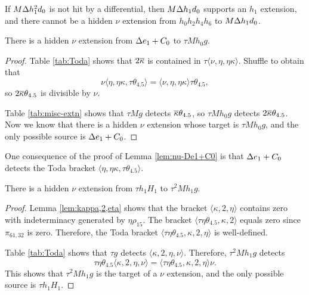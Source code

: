 \begin{remark}
\label{rem:h0h2h4h6}
If $M \Delta h_1^2 d_0$ is not hit by a differential, then
$M \Delta h_1 d_0$ supports an $h_1$ extension, and
there cannot be a hidden $\nu$ extension from
$h_0 h_2 h_4 h_6$ to $M \Delta h_1 d_0$.
\end{remark}

\begin{lemma}
\label{lem:nu-De1+C0}
There is a hidden $\nu$ extension from $\Delta e_1 + C_0$ to
$\tau M h_0 g$.
\end{lemma}

\begin{proof}
Table \ref{tab:Toda} shows that
$2 \overline{\kappa}$ is contained in 
$\tau \langle \nu, \eta, \eta \kappa \rangle$.
Shuffle to obtain that
\[
\nu \langle \eta, \eta \kappa, \tau \theta_{4.5} \rangle =
\langle \nu, \eta, \eta \kappa \rangle \tau \theta_{4.5},
\]
so $2 \overline{\kappa} \theta_{4.5}$ is divisible by $\nu$.

Table \ref{tab:misc-extn} shows that 
$\tau M g$ detects $\overline{\kappa} \theta_{4.5}$, so
$\tau M h_0 g$ detects 
$2 \overline{\kappa} \theta_{4.5}$.
Now we know that there is a hidden $\nu$ extension whose target is
$\tau M h_0 g$, and the only possible source is $\Delta e_1 + C_0$.
\end{proof}

\begin{remark}
\label{rem:eta,etakappa,ttheta4.5}
One consequence of the proof of Lemma \ref{lem:nu-De1+C0}
is that $\Delta e_1 + C_0$ detects the Toda bracket
$\langle \eta, \eta \kappa, \tau \theta_{4.5} \rangle$.
\end{remark}

\begin{lemma}
\label{lem:nu-th1H1}
There is a hidden $\nu$ extension from $\tau h_1 H_1$ to
$\tau^2 M h_1 g$.
\end{lemma}

\begin{proof}
Lemma \ref{lem:kappa,2,eta} shows that 
the bracket $\langle \kappa, 2, \eta \rangle$
contains zero with indeterminacy generated by $\eta \rho_{15}$.
The bracket $\langle \tau \eta \theta_{4.5}, \kappa, 2 \rangle$
equals zero since $\pi_{61,32}$ is zero.
Therefore, the Toda bracket 
$\langle \tau \eta \theta_{4.5}, \kappa, 2, \eta \rangle$ is well-defined.

Table \ref{tab:Toda} shows that $\tau g $ detects 
$\langle \kappa, 2, \eta, \nu \rangle$.
Therefore, $\tau^2 M h_1 g$ detects
\[
\tau \eta \theta_{4.5} \langle \kappa, 2, \eta, \nu \rangle =
\langle \tau \eta \theta_{4.5}, \kappa, 2, \eta \rangle \nu.
\]
This shows that
$\tau^2 M h_1 g$ is the target of a $\nu$ extension,
and the only possible source is $\tau h_1 H_1$.
\end{proof}

